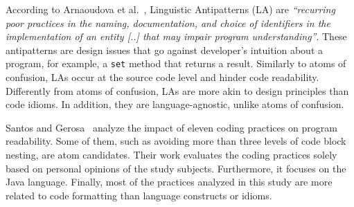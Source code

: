 


According to Arnaoudova et al.~\cite{Arnaoudova:2016:LAW}, Linguistic Antipatterns (LA) are \textit{``recurring poor practices in the naming, documentation, and choice of identifiers in the implementation of an entity [..] that may impair program understanding''}. These antipatterns are design issues that go against developer's  intuition about a program, for example, a \texttt{set} method that returns a result. Similarly to atoms of confusion, LAs occur at the source code level and hinder code readability. Differently from atoms of confusion, LAs are more akin to design principles than code idioms. In addition, they are language-agnostic, unlike atoms of confusion.

Santos and Gerosa~\cite{Santos:2018:ICP} analyze the impact of eleven coding practices on program readability. Some of them, such as avoiding more than three levels of code block nesting, are atom candidates. 
Their work evaluates the coding practices solely based on personal opinions of the study subjects. Furthermore, it focuses on the Java language. Finally, most of the practices analyzed in this study are more related to code formatting than language constructs or idioms.

